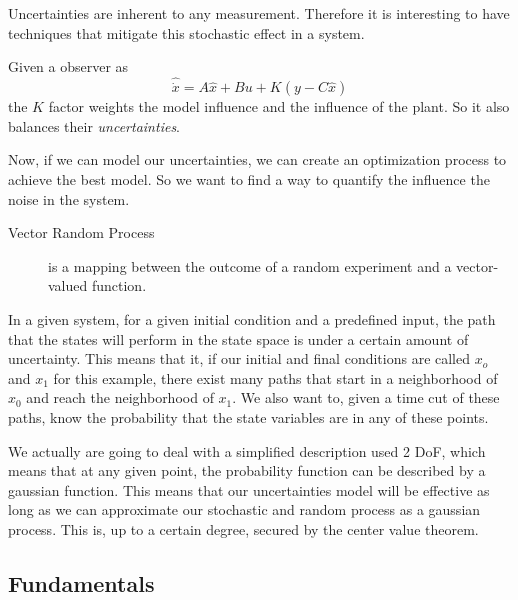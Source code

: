 
Uncertainties are inherent to any measurement. Therefore it is interesting to have techniques that mitigate this stochastic effect in a system.

Given a observer as \[
    \hat{\dot{x}}=A\hat{x}+Bu + K \left( y-C\hat{x} \right) 
\] the $K$ factor weights the model influence and the influence of the plant. So it also balances their \emph{uncertainties}.

Now, if we can model our uncertainties, we can create an optimization process to achieve the best model. So we want to find a way to quantify the influence the noise in the system.

\begin{description}
    \item[Vector Random Process] is a mapping between the outcome of a random experiment and a vector-valued function.
\end{description}

In a given system, for a given initial condition and a predefined input, the path that the states will perform in the state space is under a certain amount of uncertainty. This means that it, if our initial and final conditions are called $x_o$ and $x_1$ for this example, there exist many paths that start in a neighborhood of $x_0$ and reach the neighborhood of $x_1$. We also want to, given a time cut of these paths, know the probability that the state variables are in any of these points.

We actually are going to deal with a simplified description used 2 DoF, which means that at any given point, the probability function can be described by a gaussian function. This means that our uncertainties model will be effective as long as we can approximate our stochastic and random process as a gaussian process. This is, up to a certain degree, secured by the center value theorem.

\subsection*{Fundamentals}


